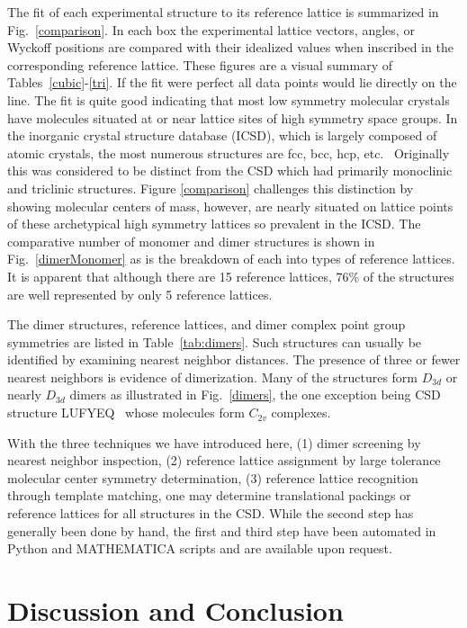 \documentclass[preprint]{revtex4}              %
\begin{document}
The fit of each experimental structure to its reference lattice is
summarized in Fig.~\ref{comparison}. In each box the experimental
lattice vectors, angles, or Wyckoff positions are compared with
their idealized values when inscribed in the corresponding reference
lattice. These figures are a visual summary of
Tables~\ref{cubic}-\ref{tri}. If the fit were perfect all data
points would lie directly on the line. The fit is quite good
indicating that most low symmetry molecular crystals have molecules
situated at or near lattice sites of high symmetry space groups. In
the inorganic crystal structure database (ICSD), which is largely
composed of atomic crystals, the most numerous structures are fcc,
bcc, hcp, etc.~\cite{Mighell80} Originally this was considered to be
distinct from the CSD which had primarily monoclinic and triclinic
structures. Figure \ref{comparison} challenges this distinction by
showing molecular centers of mass, however, are nearly situated on
lattice points of these archetypical high symmetry lattices so
prevalent in the ICSD. The comparative number of monomer and dimer
structures is shown in Fig.~\ref{dimerMonomer} as is the breakdown
of each into types of reference lattices. It is apparent that
although there are 15 reference lattices, 76\% of the structures are
well represented by only 5 reference lattices.

The dimer structures, reference lattices, and dimer complex point
group symmetries are listed in Table~\ref{tab:dimers}.  Such
structures can usually be identified by examining nearest neighbor
distances. The presence of three or fewer nearest neighbors is
evidence of dimerization. Many of the structures form $D_{3d}$ or
nearly $D_{3d}$ dimers as illustrated in Fig.~\ref{dimers}, the one
exception being CSD structure LUFYEQ~\cite{Wrackmeyer02} whose
molecules form $C_{2v}$ complexes.

With the three techniques we have introduced here, (1) dimer
screening by nearest neighbor inspection, (2) reference lattice
assignment by large tolerance molecular center symmetry
determination, (3) reference lattice recognition through template
matching, one may determine translational packings or reference
lattices for all structures in the CSD.  While the second step has
generally been done by hand, the first and third step have been
automated in Python and {M\small ATHEMATICA} scripts and are
available upon request.

\section{Discussion and Conclusion}
\label{discussion}
\end{document}
